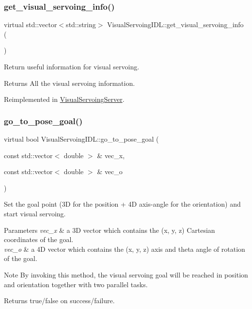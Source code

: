 \subsubsection{\texorpdfstring{get\+\_\+visual\+\_\+servoing\+\_\+info()}{get\_visual\_servoing\_info()}}
{\footnotesize\ttfamily virtual std\+::vector$<$std\+::string$>$ Visual\+Servoing\+I\+D\+L\+::get\+\_\+visual\+\_\+servoing\+\_\+info (\begin{DoxyParamCaption}{ }\end{DoxyParamCaption})\hspace{0.3cm}{\ttfamily [virtual]}}



Return useful information for visual servoing. 

\begin{DoxyReturn}{Returns}
All the visual servoing information. 
\end{DoxyReturn}


Reimplemented in \hyperlink{classVisualServoingServer_af085e2c5d4c4cfe940b3564b4ba69af6}{Visual\+Servoing\+Server}.

\mbox{\label{classVisualServoingIDL_a697368ff5a1b3f16069d1d10f25ca888}} 
\subsubsection{\texorpdfstring{go\+\_\+to\+\_\+pose\+\_\+goal()}{go\_to\_pose\_goal()}}
{\footnotesize\ttfamily virtual bool Visual\+Servoing\+I\+D\+L\+::go\+\_\+to\+\_\+pose\+\_\+goal (\begin{DoxyParamCaption}\item[{const std\+::vector$<$ double $>$ \&}]{vec\+\_\+x,  }\item[{const std\+::vector$<$ double $>$ \&}]{vec\+\_\+o }\end{DoxyParamCaption})\hspace{0.3cm}{\ttfamily [virtual]}}



Set the goal point (3D for the position + 4D axis-\/angle for the orientation) and start visual servoing. 


\begin{DoxyParams}{Parameters}
{\em vec\+\_\+x} & a 3D vector which contains the (x, y, z) Cartesian coordinates of the goal. \\
\hline
{\em vec\+\_\+o} & a 4D vector which contains the (x, y, z) axis and theta angle of rotation of the goal. \\
\hline
\end{DoxyParams}
\begin{DoxyNote}{Note}
By invoking this method, the visual servoing goal will be reached in position and orientation together with two parallel tasks. 
\end{DoxyNote}
\begin{DoxyReturn}{Returns}
true/false on success/failure. 
\end{DoxyReturn}


